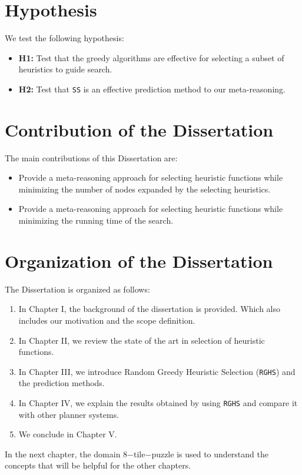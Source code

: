 \section{Hypothesis}
\noindent
We test the following hypothesis:
\begin{itemize}
\item \textbf{H1:} Test that the greedy algorithms are effective for selecting a subset of heuristics to guide search.

\item \textbf{H2:} Test that \texttt{SS} is an effective prediction method to our meta-reasoning.
\end{itemize}

\section{Contribution of the Dissertation}
\noindent
The main contributions of this Dissertation are:
\begin{itemize}
\item Provide a meta-reasoning approach for selecting heuristic functions while minimizing the number of nodes expanded by the selecting heuristics.

\item Provide a meta-reasoning approach for selecting heuristic functions while minimizing the running time of the search. 
\end{itemize}

\section{Organization of the Dissertation}
\noindent
The Dissertation is organized as follows: 
\begin{enumerate}
\item In Chapter I, the background of the dissertation is provided. Which also includes our motivation and the scope definition.
\item In Chapter II, we review the state of the art in selection of heuristic functions.
\item In Chapter III, we introduce Random Greedy Heuristic Selection (\texttt{RGHS}) and the prediction methods. 
\item In Chapter IV, we explain the results obtained by using \texttt{RGHS} and compare it with other planner systems.
\item We conclude in Chapter V.
\end{enumerate}

In the next chapter, the domain 8$-$tile$-$puzzle is used to understand the concepts that will be helpful for the other chapters. \\

\clearpage